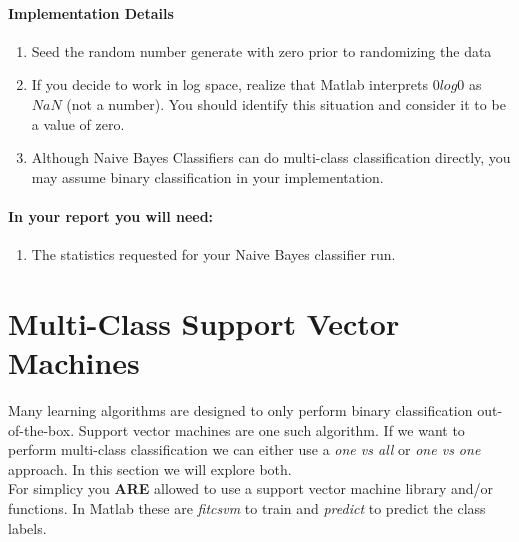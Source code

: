 \documentclass[12pt]{article}
\begin{document}
\paragraph{Implementation Details}
\begin{enumerate}
\item Seed the random number generate with zero prior to randomizing the data
\item If you decide to work in log space, realize that Matlab interprets $0log0$ as $NaN$ (not a number).  You should identify this situation and consider it to be a value of zero.
\item Although Naive Bayes Classifiers can do multi-class classification directly, you may assume binary classification in your implementation.
\end{enumerate}

\paragraph{In your report you will need:}
\begin{enumerate}
\item The statistics requested for your Naive Bayes classifier run.
\end{enumerate}

\newpage
\section{Multi-Class Support Vector Machines}\label{naive}
Many learning algorithms are designed to only perform binary classification out-of-the-box.  Support vector machines are one such algorithm.  If we want to perform multi-class classification we can either use a \emph{one vs all} or \emph{one vs one} approach.  In this section we will explore both.\\

\noindent
For simplicy you \textbf{ARE} allowed to use a support vector machine library and/or functions.  In Matlab these are \emph{fitcsvm} to train and \emph{predict} to predict the class labels.

\noindent
\end{document}
